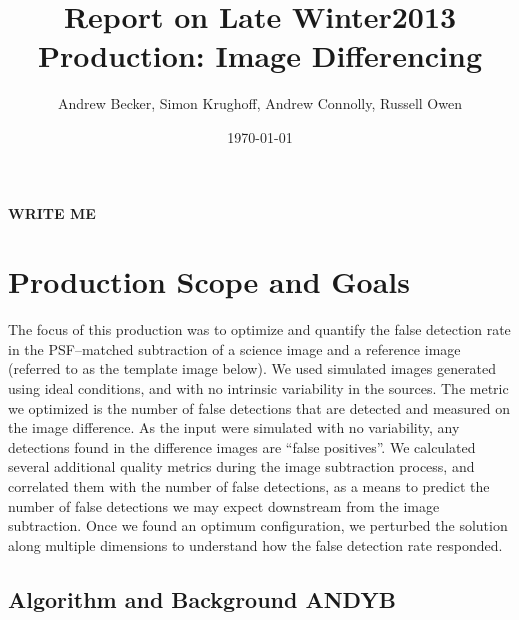 \documentclass[prd, nofootinbib, floatfix, 11pt,tightenlines,times]{article}
\author{Andrew Becker, Simon Krughoff, Andrew Connolly, Russell Owen}
\title{Report on Late Winter2013 Production: Image Differencing}
\date{\today}
\begin{document}
\maketitle

{\bf WRITE ME}

\clearpage
\tableofcontents
\clearpage

\section{Production Scope and Goals}

The focus of this production was to optimize and quantify the false
detection rate in the PSF--matched subtraction of a science image and
a reference image (referred to as the template image below).  We used
simulated images generated using ideal conditions, and with no
intrinsic variability in the sources.  The metric we optimized is the
number of false detections that are detected and measured on the image
difference.  As the input were simulated with no variability, any
detections found in the difference images are ``false positives''.  We
calculated several additional quality metrics during the image
subtraction process, and correlated them with the number of false
detections, as a means to predict the number of false detections we
may expect downstream from the image subtraction.  Once we found an
optimum configuration, we perturbed the solution along multiple
dimensions to understand how the false detection rate responded.  

\subsection{Algorithm and Background {\bf ANDYB}}
\end{document}
